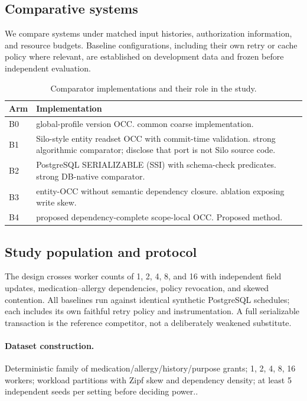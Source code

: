 \documentclass[11pt,a4paper]{article}
\begin{document}
\subsection{Comparative systems}
We compare systems under matched input histories, authorization information, and resource budgets. Baseline configurations, including their own retry or cache policy where relevant, are established on development data and frozen before independent evaluation.
\begin{table}[ht]
\centering\footnotesize
\caption{Comparator implementations and their role in the study.}
\begin{tabularx}{\linewidth}{@{}lX@{}}\toprule
Arm & Implementation \\ \midrule
B0 & global-profile version OCC. common coarse implementation. \\ 
B1 & Silo-style entity readset OCC with commit-time validation. strong algorithmic comparator; disclose that port is not Silo source code. \\ 
B2 & PostgreSQL SERIALIZABLE (SSI) with schema-check predicates. strong DB-native comparator. \\ 
B3 & entity-OCC without semantic dependency closure. ablation exposing write skew. \\ 
B4 & proposed dependency-complete scope-local OCC. Proposed method. \\ 
\bottomrule\end{tabularx}
\end{table}

\subsection{Study population and protocol}
The design crosses worker counts of 1, 2, 4, 8, and 16 with independent field updates, medication–allergy dependencies, policy revocation, and skewed contention. All baselines run against identical synthetic PostgreSQL schedules; each includes its own faithful retry policy and instrumentation. A full serializable transaction is the reference competitor, not a deliberately weakened substitute.

\paragraph{Dataset construction.} Deterministic family of medication/allergy/history/purpose grants; 1, 2, 4, 8, 16 workers; workload partitions with Zipf skew and dependency density; at least 5 independent seeds per setting before deciding power..
\end{document}
